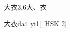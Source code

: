 \begin{entry}{大衣}{3,6}{⼤、⾐}
  \begin{phonetics}{大衣}{da4 yi1}[][HSK 2]
  \end{phonetics}
\end{entry}
